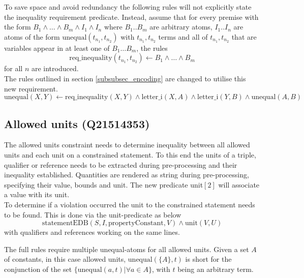 \documentclass[hyperref,bachelorofscience,fleqn]{cgvpub}
\begin{document}
To save space and avoid redundancy the following rules will not explicitly state the inequality requirement predicate. Instead, assume that for every premise with the form \(B_1 \wedge \ldots\wedge B_m \wedge I_1 \wedge I_n\) where \(B_1 .. B_m\) are arbitrary atoms, \(I_1 .. I_n\) are atoms of the form \(\text{unequal}(t_{n_1}, t_{n_2})\) with \(t_{n_1}, t_{n_2}\) terms and all of \(t_{n_1}, t_{n_2}\) that are variables appear in at least one of \(B_1 \ldots B_m\), the rules 
\begin{equation*}
\text{req\_inequality}(t_{n_1}, t_{n_2})
 \leftarrow B_1 \wedge \ldots \wedge B_m
\end{equation*} for all \(n\) are introduced.\\

The rules outlined in section \ref{subsubsec_encoding} are changed to utilise this new requirement.
\begin{equation*}
\text{unequal}(X, Y) \leftarrow \text{req\_inequality}(X, Y) \wedge \text{letter\_i}(X, A) \wedge \text{letter\_i}(Y, B) \wedge \text{unequal}(A, B)
\end{equation*}

\subsection{Allowed units (Q21514353)}\label{subsec_3_allowed_units}
The allowed units constraint needs to determine inequality between all allowed units and each unit on a constrained statement. To this end the units of a triple, qualifier or reference needs to be extracted during pre-processing and their inequality established. Quantities are rendered as string during pre-processing, specifying their value, bounds and unit. The new predicate unit\([2]\) will associate a value with its unit.\\

To determine if a violation occurred the unit to the constrained statement needs to be found. This is done via the unit-predicate as below
\begin{equation*}
\text{statementEDB}(S, I, \text{propertyConstant}, V) \wedge \text{unit}(V, U)
\end{equation*}
with qualifiers and references working on the same lines.

The full rules require multiple unequal-atoms for all allowed units. Given a set \(A\) of constants, in this case allowed units, \(\text{unequal}(\{A\}, t)\) is short for the conjunction of the set \(\{\text{unequal}(a, t) | \forall a \in A\}\), with \(t\) being an arbitrary term.
\end{document}
